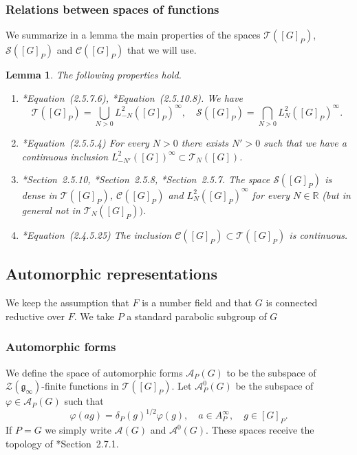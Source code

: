 \documentclass[letterpaper,11pt]{amsart}
\newcommand{\fg}{\mathfrak{g}}
\newcommand{\R}{\mathbb{R}}
\newcommand{\cA}{\mathcal{A}}
\newcommand{\cC}{\mathcal{C}}
\newcommand{\cS}{\mathcal{S}}
\newcommand{\cT}{\mathcal{T}}
\newcommand{\cZ}{\mathcal{Z}}
\newcommand{\<}{\negthickspace}
\theoremstyle{definition}
\theoremstyle{plain}
\newtheorem{lemma}[definition]{Lemma}
\theoremstyle{remark}
\numberwithin{equation}{section}
\begin{document}
\subsubsection{Relations between spaces of functions}

We summarize in a lemma the main properties of the spaces $\cT([G]_P)$, $\cS([G]_P)$ and $\cC([G]_P)$ that we will use.

\begin{lemma}
    \label{lem:functional_analysis}
    The following properties hold.
    \begin{enumerate}
        \item \cite{BPCZ}*{Equation~(2.5.7.6)}, \cite{BPCZ}*{Equation~(2.5.10.8)}. We have 
        \begin{equation}
            \cT([G]_P)=\bigcup_{N>0}  L^2_{-N}([G]_P)^\infty, \quad     \cS([G]_P) = \bigcap_{N>0} L^2_N([G]_P)^\infty.
        \end{equation}
        \item \cite{BPCZ}*{Equation~(2.5.5.4)} For every $N>0$ there exists $N'>0$ such that we have a continuous inclusion $L^2_{-N'}([G])^\infty \subset \cT_N([G])$.
        \item \cite{BPCZ}*{Section~2.5.10}, \cite{BPCZ}*{Section~2.5.8}, \cite{BPCZ}*{Section~2.5.7}. The space $\cS([G]_P)$ is dense in $\cT([G]_P)$, $\cC([G]_P)$ and $L^2_N([G]_P)^\infty$ for every $N \in \R$ (but in general not in $\cT_N([G]_P))$.
        \item \cite{BPCZ}*{Equation~(2.4.5.25)} The inclusion $\cC([G]_P) \subset \cT([G]_P)$ is continuous.
    \end{enumerate}
\end{lemma}

\subsection{Automorphic representations}

We keep the assumption that $F$ is a number field and that $G$ is connected reductive over $F$. We take $P$ a standard parabolic subgroup of $G$

\subsubsection{Automorphic forms}

We define the space of automorphic forms $\cA_P(G)$ to be the subspace of $\cZ(\fg_\infty)$-finite functions in $\cT([G]_P)$. Let $\cA_P^0(G)$ be the subspace of $\varphi \in \cA_P(G)$ such that
\begin{equation*}
    \varphi(ag)=\delta_P(g)^{1/2} \varphi(g), \quad a \in A_P^\infty, \quad g \in [G]_P.
\end{equation*}
If $P=G$ we simply write $\cA(G)$ and $\cA^0(G)$. These spaces receive the topology of \cite{BPCZ}*{Section~2.7.1}.
\end{document}
